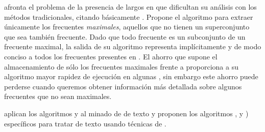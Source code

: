 
\citet{Bayardo-EfficientlyMiningLongPatternsFromDB-1998} afronta el problema de la presencia de \kitemsets largos en \D que dificultan su análisis con los métodos tradicionales, citando básicamente \apriori. Propone el algoritmo  para extraer únicamente los \itemsets frecuentes \emph{maximales}, aquellos que no tienen un superconjunto que sea también frecuente. Dado que todo \itemset frecuente es un subconjunto de un \itemset frecuente maximal, la salida de su algoritmo representa implícitamente y de modo conciso a todos los \itemsets frecuentes presentes en \D. %
 El ahorro que supone el almacenamiento de sólo los \itemsets frecuentes maximales frente a \apriori proporciona a su algoritmo mayor rapidez de ejecución en algunas \dbs, sin embargo este ahorro puede perderse cuando queremos obtener información más detallada sobre algunos \itemsets frecuentes que no sean maximales.



\citet{HoltChung-EfficientMiningOfARInTextDB-1999} aplican los algoritmos \apriori y  al minado de \dbs de texto y proponen los algoritmos ,  y ) específicos para tratar \dbs de texto usando técnicas de \ARM.




